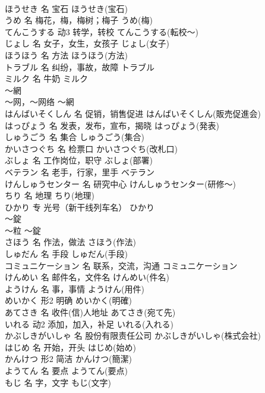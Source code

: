 \documentclass[8pt]{extreport}
\begin{document}
\begin{CJK}{UTF8}{min}
\\	ほうせき	名	宝石	ほうせき(宝石)	
\\	うめ	名	梅花，梅，梅树；梅子	うめ(梅)	
\\	てんこうする	动3	转学，转校	てんこうする(転校～)	
\\	じょし	名	女子，女生，女孩子	じょし(女子)	
\\	ほうほう	名	方法	ほうほう(方法)	
\\	トラブル	名	纠纷，事故，故障	トラブル	
\\	ミルク	名	牛奶	ミルク	
\\	～網	
\\	～网，～网络	～網	
\\	はんばいそくしん	名	促销，销售促进	はんばいそくしん(販売促進会)	
\\	はっぴょう	名	发表，发布，宣布，揭晓	はっぴょう(発表)	
\\	しゅうごう	名	集合	しゅうごう(集合)	
\\	かいさつぐち	名	检票口	かいさつぐち(改札口)	
\\	ぶしょ	名	工作岗位，职守	ぶしょ(部署)	
\\	ベテラン	名	老手，行家，里手	ベテラン	
\\	けんしゅうセンター	名	研究中心	けんしゅうセンター(研修～)	
\\	ちり	名	地理	ちり(地理)	
\\	ひかり	专	光号（新干线列车名）	ひかり	
\\	～錠	
\\	～粒	～錠	
\\	さほう	名	作法，做法	さほう(作法)	
\\	しゅだん	名	手段	しゅだん(手段)	
\\	コミュニケーション	名	联系，交流，沟通	コミュニケーション	
\\	けんめい	名	邮件名，文件名	けんめい(件名)	
\\	ようけん	名	事，事情	ようけん(用件)	
\\	めいかく	形2	明确	めいかく(明確)	
\\	あてさき	名	收件(信)人地址	あてさき(宛て先)	
\\	いれる	动2	添加，加入，补足	いれる(入れる)	
\\	かぶしきがいしゃ	名	股份有限责任公司	かぶしきがいしゃ(株式会社)	
\\	はじめ	名	开始，开头	はじめ(始め)	
\\	かんけつ	形2	简洁	かんけつ(簡潔)	
\\	ようてん	名	要点	ようてん(要点)	
\\	もじ	名	字，文字	もじ(文字)	

\end{CJK}
\end{document}
